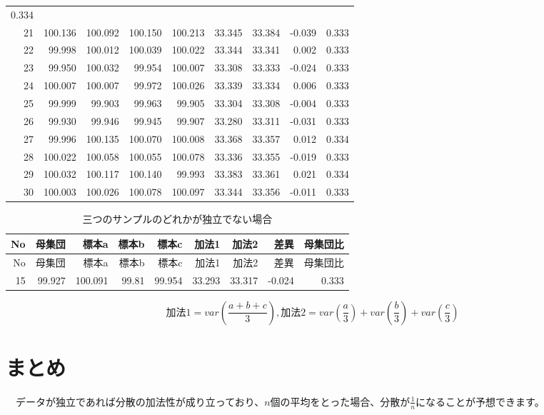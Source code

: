 \documentclass[]{tufte-handout}
\begin{document}
\begin{longtable}[]{@{}rrrrrrrrr@{}}
0.334 \\
21 & 100.136 & 100.092 & 100.150 & 100.213 & 33.345 & 33.384 & -0.039 &
0.333 \\
22 & 99.998 & 100.012 & 100.039 & 100.022 & 33.344 & 33.341 & 0.002 &
0.333 \\
23 & 99.950 & 100.032 & 99.954 & 100.007 & 33.308 & 33.333 & -0.024 &
0.333 \\
24 & 100.007 & 100.007 & 99.972 & 100.026 & 33.339 & 33.334 & 0.006 &
0.333 \\
25 & 99.999 & 99.903 & 99.963 & 99.905 & 33.304 & 33.308 & -0.004 &
0.333 \\
26 & 99.930 & 99.946 & 99.945 & 99.907 & 33.280 & 33.311 & -0.031 &
0.333 \\
27 & 99.996 & 100.135 & 100.070 & 100.008 & 33.368 & 33.357 & 0.012 &
0.334 \\
28 & 100.022 & 100.058 & 100.055 & 100.078 & 33.336 & 33.355 & -0.019 &
0.333 \\
29 & 100.032 & 100.117 & 100.140 & 99.993 & 33.383 & 33.361 & 0.021 &
0.334 \\
30 & 100.003 & 100.026 & 100.078 & 100.097 & 33.344 & 33.356 & -0.011 &
0.333 \\
\bottomrule
\end{longtable}

\begin{longtable}[]{@{}rrrrrrrrr@{}}
\caption{三つのサンプルのどれかが独立でない場合}\tabularnewline
\toprule
No & 母集団 & 標本a & 標本b & 標本c & 加法1 & 加法2 & 差異 & 母集団比 \\
\midrule
\endfirsthead
\toprule
No & 母集団 & 標本a & 標本b & 標本c & 加法1 & 加法2 & 差異 & 母集団比 \\
\midrule
\endhead
15 & 99.927 & 100.091 & 99.81 & 99.954 & 33.293 & 33.317 & -0.024 &
0.333 \\
\bottomrule
\end{longtable}

\[\mbox{加法1} = var(\frac{a + b + c}{3}),　\mbox{加法2} = var(\frac{a}{3}) + var(\frac{b}{3}) + var(\frac{c}{3})\]

\newpage

\hypertarget{ux307eux3068ux3081}{%
\section{まとめ}\label{ux307eux3068ux3081}}

　データが独立であれば分散の加法性が成り立っており、\(n\)個の平均をとった場合、分散が\(\frac{1}{n}\)になることが予想できます。
\end{document}
